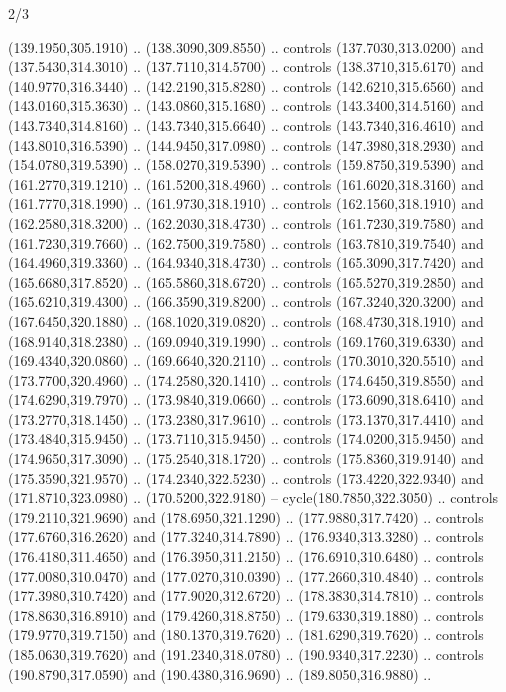 \begin{flagdescription}{2/3}
\begin{scope}[xshift=0.5\flaglength,yshift=0.5\flagwidth,scale=\stretchfactor]
\begin{scope}[scale=0.001645\flagwidth,yshift=65mm,xshift=-63mm]
\begin{scope}[y=0.80pt, x=0.80pt, yscale=-1,]
\begin{scope}[cm={{1.33333,0.0,0.0,1.33333,(0.0,1e-05)}}]
  (139.1950,305.1910) .. (138.3090,309.8550) .. controls (137.7030,313.0200) and
  (137.5430,314.3010) .. (137.7110,314.5700) .. controls (138.3710,315.6170) and
  (140.9770,316.3440) .. (142.2190,315.8280) .. controls (142.6210,315.6560) and
  (143.0160,315.3630) .. (143.0860,315.1680) .. controls (143.3400,314.5160) and
  (143.7340,314.8160) .. (143.7340,315.6640) .. controls (143.7340,316.4610) and
  (143.8010,316.5390) .. (144.9450,317.0980) .. controls (147.3980,318.2930) and
  (154.0780,319.5390) .. (158.0270,319.5390) .. controls (159.8750,319.5390) and
  (161.2770,319.1210) .. (161.5200,318.4960) .. controls (161.6020,318.3160) and
  (161.7770,318.1990) .. (161.9730,318.1910) .. controls (162.1560,318.1910) and
  (162.2580,318.3200) .. (162.2030,318.4730) .. controls (161.7230,319.7580) and
  (161.7230,319.7660) .. (162.7500,319.7580) .. controls (163.7810,319.7540) and
  (164.4960,319.3360) .. (164.9340,318.4730) .. controls (165.3090,317.7420) and
  (165.6680,317.8520) .. (165.5860,318.6720) .. controls (165.5270,319.2850) and
  (165.6210,319.4300) .. (166.3590,319.8200) .. controls (167.3240,320.3200) and
  (167.6450,320.1880) .. (168.1020,319.0820) .. controls (168.4730,318.1910) and
  (168.9140,318.2380) .. (169.0940,319.1990) .. controls (169.1760,319.6330) and
  (169.4340,320.0860) .. (169.6640,320.2110) .. controls (170.3010,320.5510) and
  (173.7700,320.4960) .. (174.2580,320.1410) .. controls (174.6450,319.8550) and
  (174.6290,319.7970) .. (173.9840,319.0660) .. controls (173.6090,318.6410) and
  (173.2770,318.1450) .. (173.2380,317.9610) .. controls (173.1370,317.4410) and
  (173.4840,315.9450) .. (173.7110,315.9450) .. controls (174.0200,315.9450) and
  (174.9650,317.3090) .. (175.2540,318.1720) .. controls (175.8360,319.9140) and
  (175.3590,321.9570) .. (174.2340,322.5230) .. controls (173.4220,322.9340) and
  (171.8710,323.0980) .. (170.5200,322.9180) -- cycle(180.7850,322.3050) ..
  controls (179.2110,321.9690) and (178.6950,321.1290) .. (177.9880,317.7420) ..
  controls (177.6760,316.2620) and (177.3240,314.7890) .. (176.9340,313.3280) ..
  controls (176.4180,311.4650) and (176.3950,311.2150) .. (176.6910,310.6480) ..
  controls (177.0080,310.0470) and (177.0270,310.0390) .. (177.2660,310.4840) ..
  controls (177.3980,310.7420) and (177.9020,312.6720) .. (178.3830,314.7810) ..
  controls (178.8630,316.8910) and (179.4260,318.8750) .. (179.6330,319.1880) ..
  controls (179.9770,319.7150) and (180.1370,319.7620) .. (181.6290,319.7620) ..
  controls (185.0630,319.7620) and (191.2340,318.0780) .. (190.9340,317.2230) ..
  controls (190.8790,317.0590) and (190.4380,316.9690) .. (189.8050,316.9880) ..

\end{scope}
\end{scope}
\end{scope}
\end{scope}
\end{flagdescription}
